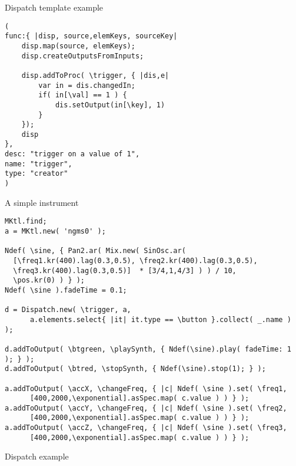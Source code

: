 \documentclass[pdf,slideColor,colorBG,accumulate,total]{prosper}
\begin{document}
\begin{slide}{Dispatch template example}
\footnotesize
\begin{verbatim}
(
func:{ |disp, source,elemKeys, sourceKey|
	disp.map(source, elemKeys);	
	disp.createOutputsFromInputs;
	
	disp.addToProc( \trigger, { |dis,e|
		var in = dis.changedIn;
		if( in[\val] == 1 ) {
			dis.setOutput(in[\key], 1)
		}
	});
  	disp
},
desc: "trigger on a value of 1",
name: "trigger",
type: "creator"
)
\end{verbatim}
\end{slide}

\begin{slide}{A simple instrument}
 
 \scriptsize
 \begin{verbatim}
MKtl.find;
a = MKtl.new( 'ngms0' );

Ndef( \sine, { Pan2.ar( Mix.new( SinOsc.ar( 
  [\freq1.kr(400).lag(0.3,0.5), \freq2.kr(400).lag(0.3,0.5), 
  \freq3.kr(400).lag(0.3,0.5)]  * [3/4,1,4/3] ) ) / 10,
  \pos.kr(0) ) } );
Ndef( \sine ).fadeTime = 0.1;

d = Dispatch.new( \trigger, a, 
      a.elements.select{ |it| it.type == \button }.collect( _.name ) );

d.addToOutput( \btgreen, \playSynth, { Ndef(\sine).play( fadeTime: 1 ); } );
d.addToOutput( \btred, \stopSynth, { Ndef(\sine).stop(1); } );

a.addToOutput( \accX, \changeFreq, { |c| Ndef( \sine ).set( \freq1, 
      [400,2000,\exponential].asSpec.map( c.value ) ) } );
a.addToOutput( \accY, \changeFreq, { |c| Ndef( \sine ).set( \freq2, 
      [400,2000,\exponential].asSpec.map( c.value ) ) } );
a.addToOutput( \accZ, \changeFreq, { |c| Ndef( \sine ).set( \freq3, 
      [400,2000,\exponential].asSpec.map( c.value ) ) } );
 \end{verbatim}

\end{slide}

\begin{slide}{Dispatch example}
 
\end{slide}
\end{document}
